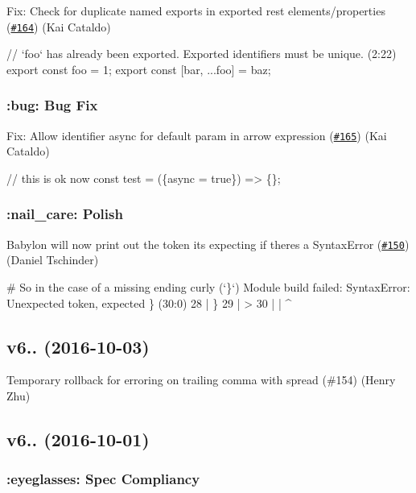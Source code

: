 Fix\+: Check for duplicate named exports in exported rest elements/properties (\href{https://github.com/babel/babylon/pull/164}{\tt \#164}) (Kai Cataldo)


\begin{DoxyCode}
// `foo` has already been exported. Exported identifiers must be unique. (2:22)
export const foo = 1;
export const [bar, ...foo] = baz;
\end{DoxyCode}


\subsubsection*{\+:bug\+: Bug Fix}

Fix\+: Allow identifier {\ttfamily async} for default param in arrow expression (\href{https://github.com/babel/babylon/pull/165}{\tt \#165}) (Kai Cataldo)


\begin{DoxyCode}
// this is ok now
const test = (\{async = true\}) => \{\};
\end{DoxyCode}


\subsubsection*{\+:nail\+\_\+care\+: Polish}

Babylon will now print out the token it\textquotesingle{}s expecting if there\textquotesingle{}s a {\ttfamily Syntax\+Error} (\href{https://github.com/babel/babylon/pull/150}{\tt \#150}) (Daniel Tschinder)


\begin{DoxyCode}
# So in the case of a missing ending curly (`\}`)
Module build failed: SyntaxError: Unexpected token, expected \} (30:0)
  28 |   \}
  29 |
> 30 |
     | ^
\end{DoxyCode}


\subsection*{v6.. (2016-\/10-\/03)}

Temporary rollback for erroring on trailing comma with spread (\#154) (Henry Zhu)

\subsection*{v6.. (2016-\/10-\/01)}

\subsubsection*{\+:eyeglasses\+: Spec Compliancy}

